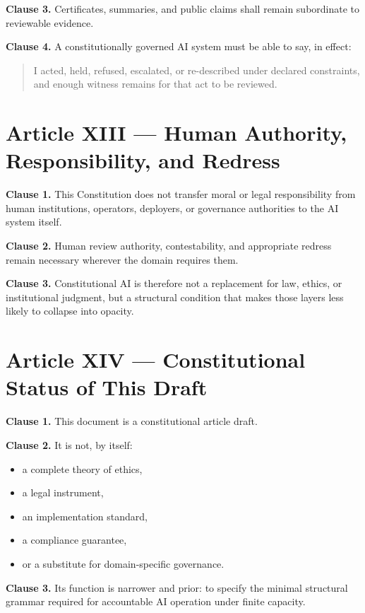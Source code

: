 \documentclass[11pt]{article}
\begin{document}
\textbf{Clause 3.} Certificates, summaries, and public claims shall remain subordinate to reviewable evidence.

\textbf{Clause 4.} A constitutionally governed AI system must be able to say, in effect:
\begin{quote}
I acted, held, refused, escalated, or re-described under declared constraints, and enough witness remains for that act to be reviewed.
\end{quote}

\section*{Article XIII --- Human Authority, Responsibility, and Redress}

\textbf{Clause 1.} This Constitution does not transfer moral or legal responsibility from human institutions, operators, deployers, or governance authorities to the AI system itself.

\textbf{Clause 2.} Human review authority, contestability, and appropriate redress remain necessary wherever the domain requires them.

\textbf{Clause 3.} Constitutional AI is therefore not a replacement for law, ethics, or institutional judgment, but a structural condition that makes those layers less likely to collapse into opacity.

\section*{Article XIV --- Constitutional Status of This Draft}

\textbf{Clause 1.} This document is a constitutional article draft.

\textbf{Clause 2.} It is not, by itself:
\begin{itemize}[leftmargin=2em]
    \item a complete theory of ethics,
    \item a legal instrument,
    \item an implementation standard,
    \item a compliance guarantee,
    \item or a substitute for domain-specific governance.
\end{itemize}

\textbf{Clause 3.} Its function is narrower and prior: to specify the minimal structural grammar required for accountable AI operation under finite capacity.
\end{document}
